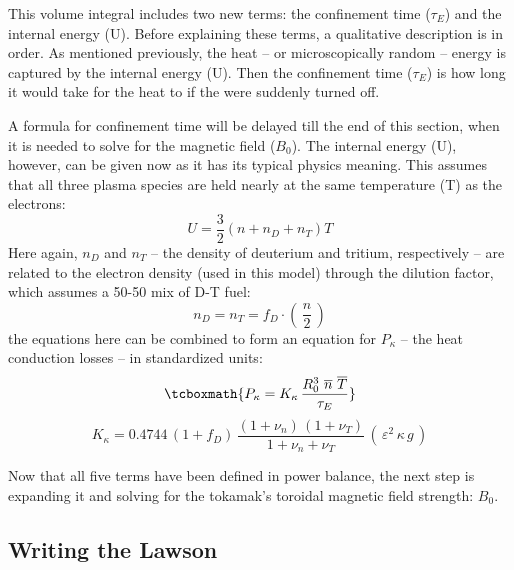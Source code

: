 This volume integral includes two new terms: the confinement time ($\tau_E$) and the internal energy (U). Before explaining these terms, a qualitative description is in order. As mentioned previously, the heat -- or microscopically random -- energy is captured by the internal energy (U). Then the confinement time ($\tau_E$) is how long it would take for the heat to  if the  were suddenly turned off.

A formula for confinement time will be delayed till the end of this section, when it is needed to solve for the magnetic field ($B_0$). The internal energy (U), however, can be given now as it has its typical physics meaning. This assumes that all three plasma species are held nearly at the same temperature (T) as the electrons:
\begin{equation}
	U = \frac{3}{2} \left( n + n_D + n_T \right) T
\end{equation}
Here again, $n_D$ and $n_T$ -- the density of deuterium and tritium, respectively -- are related to the electron density (used in this model) through the dilution factor, which assumes a 50-50 mix of D-T fuel:
\begin{equation}
	n_D = n_T = f_D \cdot \left( \, \frac{n}{2} \, \right)
\end{equation}
 the equations here can be combined to form an equation for $P_\kappa$ -- the heat conduction losses -- in standardized units:
\begin{equation}
	\label{eq:pkappa}
	\tcboxmath{
	P_\kappa = K_\kappa \, \frac{ R_0 ^ 3 \ \overline{n}  \ \overline{T}  }{\tau_E}
	}
\end{equation}
\begin{equation}
	K_\kappa = 0.4744 \, ( 1 + f_D ) \, \frac{ (1 + \nu_n) \, (1 + \nu_T) }{1 + \nu_n + \nu_T } \, ( \, \varepsilon^2 \, \kappa \, g \, )
\end{equation}

Now that all five terms have been defined in power balance, the next step is expanding it and solving for the tokamak's toroidal magnetic field strength: $B_0$.

\subsection{Writing the Lawson }

